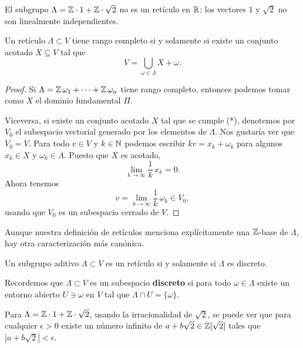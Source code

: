 \begin{ejemplo}
  El subgrupo $\Lambda = \mathbb{Z}\cdot 1 + \mathbb{Z}\cdot \sqrt{2}$ no es un retículo en
  $\mathbb{R}$: los vectores $1$ y $\sqrt{2}$ no son linealmente independientes.
\end{ejemplo}

\begin{lema}
  Un retículo $\Lambda \subset V$ tiene rango completo si y solamente si existe
  un conjunto acotado $X \subseteq V$ tal que
  \[ \tag{*} V = \bigcup_{\omega \in \Lambda} X + \omega. \]

  \begin{proof}
    Si $\Lambda = \mathbb{Z}\,\omega_1 + \cdots + \mathbb{Z}\,\omega_n$ tiene rango completo,
    entonces podemos tomar como $X$ el dominio fundamental $\Pi$.

    Viceversa, si existe un conjunto acotado $X$ tal que se cumple
    (*), denotemos por $V_0$ el subespacio vectorial generado por los elementos
    de $\Lambda$. Nos gustaría ver que $V_0 = V$. Para todo $v \in V$ y
    $k \in \mathbb{N}$ podemos escribir $k v = x_k + \omega_k$ para algunos $x_k \in X$
    y $\omega_k \in \Lambda$. Puesto que $X$ es acotado,
    $$\lim_{k\to\infty} \frac{1}{k}\,x_k = 0.$$
    Ahora tenemos
    $$v = \lim_{k\to\infty} \frac{1}{k}\,\omega_k \in V_0,$$
    usando que $V_0$ es un subespacio cerrado de $V$.
  \end{proof}
\end{lema}

Aunque nuestra definición de retículos menciona explícitamente una $\mathbb{Z}$-base de
$\Lambda$, hay otra caracterización más canónica.

\begin{lema}
  Un subgrupo aditivo $\Lambda \subset V$ es un retículo si y solamente
  si $\Lambda$ es discreto.
\end{lema}

Recordemos que $\Lambda \subset V$ es un subespacio \textbf{discreto} si para
todo $\omega \in \Lambda$ existe un entorno abierto $U \ni \omega$ en $V$ tal
que $\Lambda \cap U = \{ \omega \}$.

\begin{ejemplo}
  Para $\Lambda = \mathbb{Z}\cdot 1 + \mathbb{Z}\cdot \sqrt{2}$, usando la irracionalidad de
  $\sqrt{2}$, se puede ver que para cualquier $\epsilon > 0$ existe un número
  infinito de $a + b\sqrt{2} \in \mathbb{Z} [\sqrt{2}]$ tales que
  $|a + b\sqrt{2}| < \epsilon$.
\end{ejemplo}

